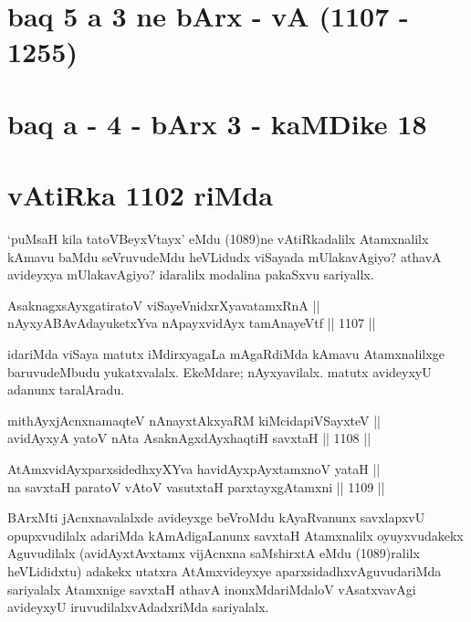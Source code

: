 \section*{baq 5 a 3 ne bArx - vA (1107 - 1255)}

\section*{baq a - 4 - bArx 3 - kaMDike 18}

\section*{vAtiRka 1102 riMda} 

\begin{artha}
`puMsaH kila tatoV\s BeyxVtayx' eMdu (1089)ne vAtiRkadalilx Atamxnalilx kAmavu baMdu seVruvudeMdu heVLidudx viSayada mUlakavAgiyo? athavA avideyxya mUlakavAgiyo? idaralilx modalina pakaSxvu sariyallx.
\end{artha}

\begin{shl}
AsaknagxsAyx\s \s gatiratoV viSayeVnidxrXyavatamxRnA || \\
nAyxyABAvAdayuketxYva nApayxvidAyx tamAnayeVtf \hfill || 1107 ||  
\end{shl}

\begin{artha}
idariMda viSaya matutx iMdirxyagaLa mAgaRdiMda kAmavu Atamxnalilxge baruvudeMbudu yukatxvalalx. EkeMdare; nAyxyavilalx. matutx avideyxyU adanunx taralAradu.
\end{artha}


\begin{shl}
mithAyxjAcnxnamaqteV nAnayxtAkxyaRM kiMcidapiVSayxteV ||  \\
avidAyxyA yatoV nAta AsaknAgxdAyxhaqtiH savxtaH \hfill || 1108 ||  
\end{shl}
				
\begin{shl}
AtAmxvidAyxparxsidedhxyXYva havidAyx\s pAyxtamxnoV yataH || \\
na savxtaH paratoV vA\s toV vasutxtaH parxtayxgAtamxni \hfill || 1109 ||  
\end{shl}

\begin{artha}
BArxMti jAcnxnavalalxde avideyxge beVroMdu kAyaRvanunx savxlapxvU opupxvudilalx adariMda kAmAdigaLanunx savxtaH Atamxnalilx oyuyxvudakekx Aguvudilalx (avidAyxtAvxtamx vijAcnxna saMshirxtA eMdu (1089)ralilx heVLididxtu) adakekx utatxra AtAmxvideyxye aparxsidadhxvAguvudariMda sariyalalx Atamxnige savxtaH athavA inonxMdariMdaloV vAsatxvavAgi avideyxyU iruvudilalxvAdadxriMda sariyalalx.
\end{artha}

